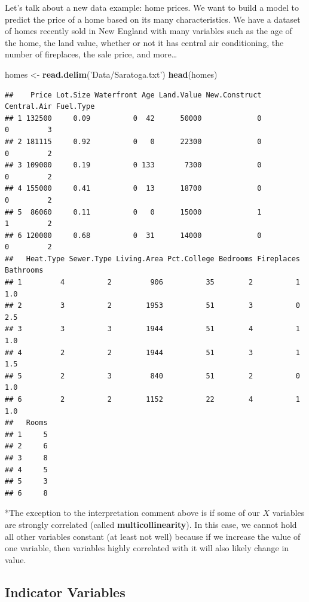 \documentclass[
]{book}
\newenvironment{Shaded}{\begin{snugshade}}{\end{snugshade}}
\newcommand{\KeywordTok}[1]{\textcolor[rgb]{0.13,0.29,0.53}{\textbf{#1}}}
\newcommand{\NormalTok}[1]{#1}
\newcommand{\StringTok}[1]{\textcolor[rgb]{0.31,0.60,0.02}{#1}}
\begin{document}
Let's talk about a new data example: home prices. We want to build a model to predict the price of a home based on its many characteristics. We have a dataset of homes recently sold in New England with many variables such as the age of the home, the land value, whether or not it has central air conditioning, the number of fireplaces, the sale price, and more\ldots{}

\begin{Shaded}
\begin{Highlighting}[]
\NormalTok{homes <-}\StringTok{ }\KeywordTok{read.delim}\NormalTok{(}\StringTok{'Data/Saratoga.txt'}\NormalTok{)}
\KeywordTok{head}\NormalTok{(homes)}
\end{Highlighting}
\end{Shaded}

\begin{verbatim}
##    Price Lot.Size Waterfront Age Land.Value New.Construct Central.Air Fuel.Type
## 1 132500     0.09          0  42      50000             0           0         3
## 2 181115     0.92          0   0      22300             0           0         2
## 3 109000     0.19          0 133       7300             0           0         2
## 4 155000     0.41          0  13      18700             0           0         2
## 5  86060     0.11          0   0      15000             1           1         2
## 6 120000     0.68          0  31      14000             0           0         2
##   Heat.Type Sewer.Type Living.Area Pct.College Bedrooms Fireplaces Bathrooms
## 1         4          2         906          35        2          1       1.0
## 2         3          2        1953          51        3          0       2.5
## 3         3          3        1944          51        4          1       1.0
## 4         2          2        1944          51        3          1       1.5
## 5         2          3         840          51        2          0       1.0
## 6         2          2        1152          22        4          1       1.0
##   Rooms
## 1     5
## 2     6
## 3     8
## 4     5
## 5     3
## 6     8
\end{verbatim}

*The exception to the interpretation comment above is if some of our \(X\) variables are strongly correlated (called \textbf{multicollinearity}). In this case, we cannot hold all other variables constant (at least not well) because if we increase the value of one variable, then variables highly correlated with it will also likely change in value.

\hypertarget{indicator-variables}{%
\subsection{Indicator Variables}\label{indicator-variables}}
\end{document}
